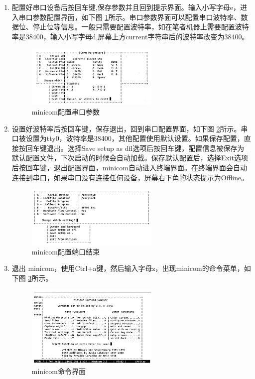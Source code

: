 \begin{enumerate}
	\item 配置好串口设备后按回车键,保存参数并且回到提示界面。输入小写字母e，进入串口参数配置界面，如下图 \ref{minicom配置串口参数}所示。串口参数界面可以配置串口波特率、数据位、停止位等信息。一般只需要配置波特率，如在笔者机器上需要配置波特率是38400，输入小写字母d,屏幕上方current字符串后的波特率改变为38400。
	\begin{figure}[h]
		\centering
		\includegraphics[width=0.6\textwidth]{figures/08-01-minicom配置串口参数.png}
		\caption{minicom配置串口参数}
		\label{minicom配置串口参数}
	\end{figure}

	\item 设置好波特率后按回车键，保存退出，回到串口配置界面，如下图 \ref{minicom配置端口结束}所示。串口被设置为tty0，波特率是38400，其他配置使用默认设置。如果保存配置，直接按回车键退出。选择Save setup as dfl选项后按回车键，配置信息被保存为默认配置文件，下次启动的时候会自动加载。保存默认配置后，选择Exit选项后按回车键，退出配置界面，minicom自动进入终端界面。在终端界面会自动连接到串口，如果串口没有连接任何设备，屏幕右下角的状态提示为Offline。
	\begin{figure}[h]
		\centering
		\includegraphics[width=0.6\textwidth]{figures/08-01-minicom配置端口结束.png}
		\caption{minicom配置端口结束}
		\label{minicom配置端口结束}
	\end{figure}

	\item 退出 minicom，使用Ctrl+a键，然后输入字母z，出现minicom的命令菜单，如下图 \ref{minicom命令界面}所示。
	\begin{figure}[h]
		\centering
		\includegraphics[width=0.6\textwidth]{figures/08-01-minicom命令界面.png}
		\caption{minicom命令界面}
		\label{minicom命令界面}
	\end{figure}
\end{enumerate}



